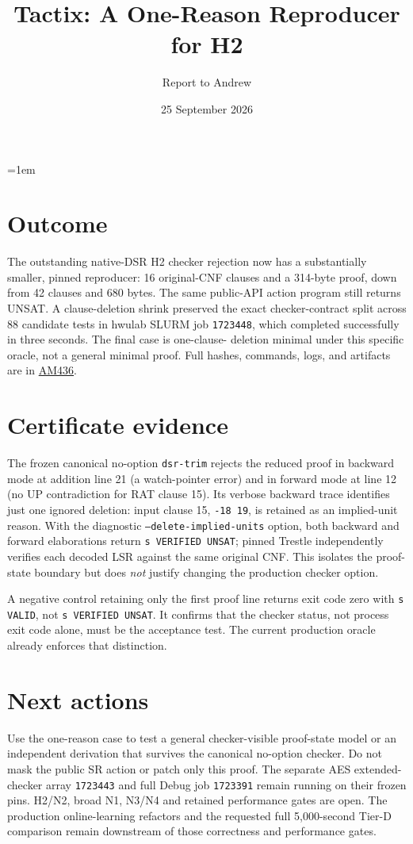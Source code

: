 \documentclass[10pt]{article}
\title{Tactix: A One-Reason Reproducer for H2}
\author{Report to Andrew}
\date{25 September 2026}
\begin{document}
\maketitle
\vspace{-1.5em}
\emergencystretch=1em

\section*{Outcome}
The outstanding native-DSR H2 checker rejection now has a substantially
smaller, pinned reproducer: 16 original-CNF clauses and a 314-byte proof,
down from 42 clauses and 680 bytes. The same public-API action program still
returns UNSAT. A clause-deletion shrink preserved the exact checker-contract
split across 88 candidate tests in hwulab SLURM job \texttt{1723448}, which
completed successfully in three seconds. The final case is one-clause-
deletion minimal under this specific oracle, not a general minimal proof.
Full hashes, commands, logs, and artifacts are in
\href{../../benchmarks/reports/2026-09-25-am436-h2-one-reason-shrink.md}{AM436}.

\section*{Certificate evidence}
The frozen canonical no-option \texttt{dsr-trim} rejects the reduced proof
in backward mode at addition line 21 (a watch-pointer error) and in forward
mode at line 12 (no UP contradiction for RAT clause 15). Its verbose backward
trace identifies just one ignored deletion: input clause 15, \texttt{-18 19},
is retained as an implied-unit reason. With the diagnostic
\texttt{--delete-implied-units} option, both backward and forward elaborations
return \texttt{s VERIFIED UNSAT}; pinned Trestle independently verifies each
decoded LSR against the same original CNF. This isolates the proof-state
boundary but does \emph{not} justify changing the production checker option.

A negative control retaining only the first proof line returns exit code zero
with \texttt{s VALID}, not \texttt{s VERIFIED UNSAT}. It confirms that the
checker status, not process exit code alone, must be the acceptance test.
The current production oracle already enforces that distinction.

\section*{Next actions}
Use the one-reason case to test a general checker-visible proof-state model
or an independent derivation that survives the canonical no-option checker.
Do not mask the public SR action or patch only this proof. The separate AES
extended-checker array \texttt{1723443} and full Debug job \texttt{1723391}
remain running on their frozen pins. H2/N2, broad N1, N3/N4 and retained
performance gates are open. The production online-learning refactors and the
requested full 5,000-second Tier-D comparison remain downstream of those
correctness and performance gates.
\end{document}
